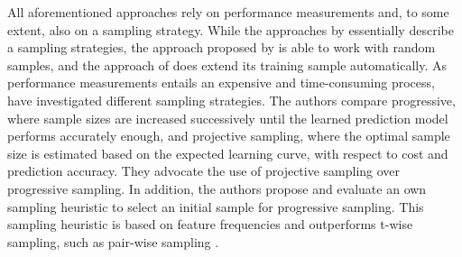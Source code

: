 All aforementioned approaches rely on performance measurements and, to
some extent, also on a  sampling strategy. While the approaches by
\cite{siegmund_predicting_2012,siegmund_performance-influence_2015} essentially describe a sampling strategies,
the approach proposed by \cite{zhang_performance_2015} is able to work with random samples, and the
approach of \cite{guo_variability-aware_2013} does extend its training sample automatically. As
performance measurements entails an expensive and time-consuming process,
\cite{sarkar_cost-efficient_2015} have investigated different sampling strategies.
The authors compare progressive, where sample sizes are increased successively
until the learned prediction model performs accurately enough, and projective
sampling, where the optimal sample size is estimated based on the expected
learning curve, with respect to cost and prediction accuracy. They advocate the
use of projective sampling over progressive sampling. In addition, the authors
propose and evaluate an own sampling heuristic to select an initial sample for
progressive sampling. This sampling heuristic is based on feature frequencies
and outperforms t-wise sampling, such as pair-wise sampling
\citep{sarkar_cost-efficient_2015}.